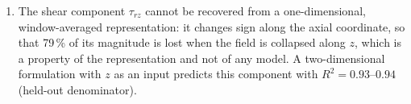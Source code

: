 \documentclass[subscriptcorrection,upint,varvw,barcolor=Goldenrod3,mathalfa=cal=euler,balance,hyphenate,french,pdf-a]{asmejour} %
\begin{document}
\begin{enumerate}
\item The shear component $\tau_{rz}$ cannot be recovered from a one-dimensional, window-averaged representation: it changes sign along the axial coordinate, so that 79\,\% of its magnitude is lost when the field is collapsed along $z$, which is a property of the representation and not of any model. A two-dimensional formulation with $z$ as an input predicts this component with $R^2 = 0.93$--$0.94$ (held-out denominator). %

\end{enumerate}
\end{document}
